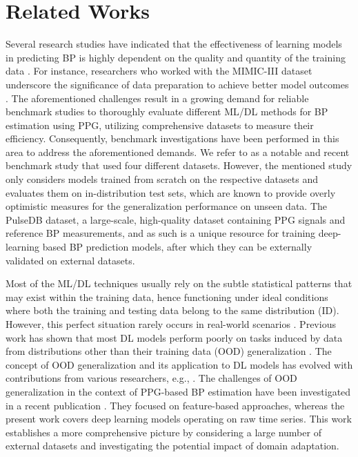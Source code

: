 \section{Related Works}
\label{sec:II}

\label{sec:II-B}
Several research studies have indicated that the effectiveness of learning models in predicting BP is highly dependent on the quality and quantity of the training data \cite{qin2023machine, treebupachatsakul2022cuff, zabihi2021bp}. For instance,  researchers who worked with the MIMIC-III dataset underscore the significance of data preparation to achieve better model outcomes \cite{chu2023non}. The aforementioned challenges result in a growing demand for reliable benchmark studies to thoroughly evaluate different ML/DL methods for BP estimation using PPG, utilizing comprehensive datasets to measure their efficiency. Consequently, benchmark investigations have been performed in this area to address the aforementioned demands. We refer to \cite{gonzalez2023benchmark} as a notable and recent benchmark study that used four different datasets. 
However, the mentioned study only considers models trained from scratch on the respective datasets and evaluates them on in-distribution test sets, which are known to provide overly optimistic measures for the generalization performance on unseen data. The PulseDB dataset, a large-scale, high-quality dataset containing PPG signals and reference BP measurements, and as such is a unique resource for training deep-learning based BP prediction models, after which they can be externally validated on external datasets.



Most of the ML/DL techniques usually rely on the subtle statistical patterns that may exist within the training data, hence functioning under ideal conditions where both the training and testing data belong to the same distribution (ID). However, this perfect situation rarely occurs in real-world scenarios \cite{zhang2021deep, engstrom2019exploring}. Previous work has shown that most DL models perform poorly on tasks induced by data from distributions other than their training data (OOD) generalization \cite{ballas2022domain}. The concept of OOD generalization and its application to DL models has evolved with contributions from various researchers, e.g., \cite{gwon2023out, yi2021improved, ye2021towards}. 
The challenges of OOD generalization in the context of PPG-based BP estimation have been investigated in a recent publication \cite{weber2023intensive}. They focused on feature-based approaches, whereas the present work covers deep learning models operating on raw time series. This work establishes a more comprehensive picture by considering a large number of external datasets and investigating the potential impact of domain adaptation.


